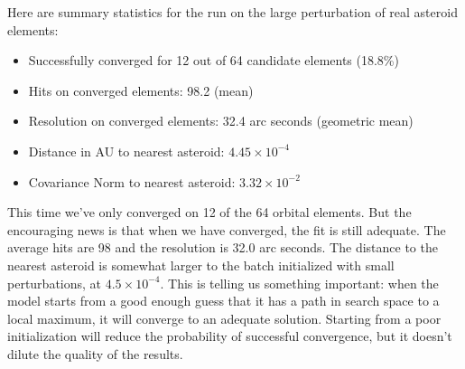 Here are summary statistics for the run on the large perturbation of real asteroid elements:
\begin{itemize}
\item Successfully converged for 12 out of 64 candidate elements (18.8\%)
\item Hits on converged elements: 98.2 (mean)
\item Resolution on converged elements: 32.4 arc seconds (geometric mean)
\item Distance in AU to nearest asteroid: $4.45 \times 10^{-4}$
\item Covariance Norm to nearest asteroid: $3.32 \times 10^{-2}$
\end{itemize}
This time we've only converged on 12 of the 64 orbital elements.
But the encouraging news is that when we have converged, the fit is still adequate.
The average hits are 98 and the resolution is 32.0 arc seconds.
The distance to the nearest asteroid is somewhat larger to the batch initialized with small perturbations, at $4.5 \times 10^{-4}$.
This is telling us something important: 
when the model starts from a good enough guess that it has a path in search space to a local maximum, it will converge to an adequate solution.
Starting from a poor initialization will reduce the probability of successful convergence, but it doesn't dilute the quality of the results.
